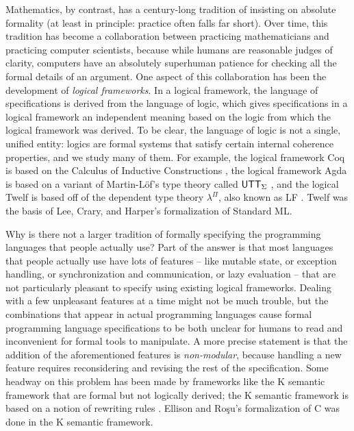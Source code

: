 Mathematics, by contrast, has a century-long tradition of insisting on
absolute formality (at least in principle: practice often falls far
short).
%
Over time, this tradition
has become a collaboration between practicing mathematicians and
practicing computer scientists, because while humans are reasonable
judges of clarity, computers have an absolutely superhuman patience
for checking all the formal details of an argument.  One aspect of
this collaboration has been the development of {\it logical
  frameworks}. In a logical framework, the language of specifications
is derived from the language of logic, which gives specifications in a
logical framework an independent meaning based on the logic from which
the logical framework was derived. To be clear, the language of logic
is not a single, unified entity: logics are formal systems that
satisfy certain internal coherence properties, and we study many of
them. For example, the logical framework Coq is based on the Calculus
of Inductive Constructions \cite{coq10coq}, the logical framework Agda
is based on a variant of Martin-L\"of's type theory called ${\sf
  UTT}_\Sigma$ \cite{norell08towards}, and the logical Twelf is based
off of the dependent type theory $\lambda^\Pi$, also known as LF
\cite{pfenning99system}. Twelf was the basis of Lee, Crary, and
Harper's formalization of Standard ML.  %

Why is there not a larger tradition of formally specifying the
programming languages that people actually use? Part of the answer is
that most languages that people actually use have lots of features --
like mutable state, or exception handling, or synchronization and
communication, or lazy evaluation -- that are not particularly
pleasant to specify using existing logical frameworks. Dealing with a
few unpleasant features at a time might not be much trouble, but the
combinations that appear in actual programming languages cause formal
programming language specifications to be both unclear for humans to
read and inconvenient for formal tools to manipulate. A more precise
statement is that the addition of the aforementioned features is {\it
  non-modular}, because handling a new feature requires reconsidering
and revising the rest of the specification.  Some headway on this
problem has been made by frameworks like the K semantic framework that
are formal but not logically derived; the K semantic framework is
based on a notion of rewriting rules \cite{rosu10overview}. Ellison
and Ro\c{s}u's formalization of C was done in the K semantic
framework.

